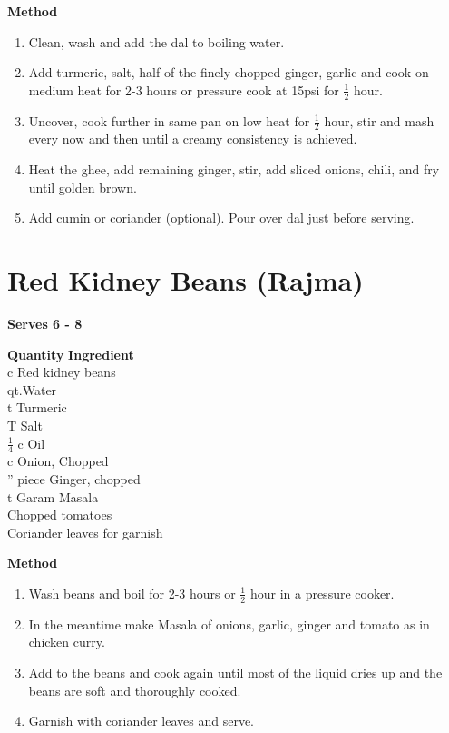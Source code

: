 {\bf Method}
\begin{enumerate}
\item Clean, wash and add the dal to boiling water.
\item Add turmeric, salt, half of the finely chopped ginger, garlic and cook 
on medium heat for 2-3 hours or pressure cook at 15psi for $\frac{1}{2}$ hour.
\item Uncover, cook further in same pan on low heat for $\frac{1}{2}$
hour, stir and mash every now and then until a creamy consistency is achieved.
\item Heat the ghee, add remaining ginger, stir, add sliced onions, chili, and
fry until golden brown.
\item Add cumin or coriander (optional). Pour over dal just before serving.  
\end{enumerate}


\section{Red Kidney Beans (Rajma)}
{\bf Serves 6 - 8}

\begin{tabbing}
\hspace{1.0cm}  \={\bf Quantity}   \hspace{3.0cm} \={\bf Ingredient}\\
 c\> Red kidney beans\\
 qt.\>Water\\
  t \>Turmeric\\
 T \>Salt\\
\>  $\frac{1}{4}$ c\> Oil\\
 c \>Onion, Chopped\\
'' piece \>Ginger, chopped \\
 t \>Garam Masala\\
 \>Chopped tomatoes\\
\>\>  Coriander leaves for garnish\\
\end{tabbing}

{\bf Method}
\begin{enumerate}
\item Wash beans and boil for 2-3 hours or $\frac{1}{2}$ hour in a pressure cooker.
\item In the meantime make Masala of onions, garlic, ginger and tomato as in
chicken curry.
\item Add to the beans and cook again until most of the liquid dries up and the
beans are soft and thoroughly cooked.
\item Garnish with coriander leaves and serve.
\end{enumerate}

